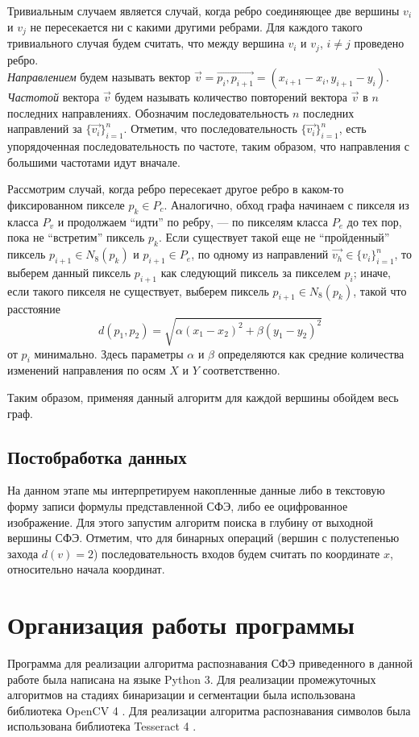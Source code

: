 \documentclass[makeidx, a4paper, 14pt]{extarticle}
\begin{document}
Тривиальным случаем является случай, когда ребро соединяющее две вершины $v_i$ и $v_j$ не пересекается ни с какими другими ребрами.
Для каждого такого тривиального случая будем считать, что между вершина $v_i$ и $v_j$, ${i \neq j}$ проведено ребро. \\

\emph{Направлением} будем называть вектор $\vec{v}=\overrightarrow{p_i,p_{i+1}}=(x_{i+1}-x_i, y_{i+1}-y_i)$.
\emph{Частотой} вектора $\vec{v}$ будем называть количество повторений вектора $\vec{v}$ в $n$ последних направлениях.
Обозначим последовательность $n$ последних направлений за $\{\vec{v_i}\}_{i=1}^{n}$.
Отметим, что последовательность $\{\vec{v_i}\}_{i=1}^{n}$, есть упорядоченная последовательность по частоте,
таким образом, что направления с большими частотами идут вначале.

Рассмотрим случай, когда ребро пересекает другое ребро в каком-то фиксированном пикселе $p_k \in P_c$.
Аналогично, обход графа начинаем с пикселя из класса $P_v$ и продолжаем ``идти'' по ребру, --- по пикселям класса $P_e$ до тех пор,
пока не ``встретим'' пиксель $p_k$. Если существует такой еще не ``пройденный'' пиксель $p_{i+1} \in N_8(p_k)$ и $p_{i+1} \in P_e$,
по одному из направлений $\vec{v_h} \in \{v_i\}_{i=1}^{n}$, то выберем данный пиксель $p_{i+1}$ как следующий пиксель за пикселем $p_i$;
иначе, если такого пикселя не существует, выберем пиксель $p_{i+1} \in N_8(p_k)$, такой что расстояние \[d(p_1, p_2) = \sqrt{\alpha(x_1-x_2)^2+\beta(y_1-y_2)^2}\]
от $p_i$ минимально. Здесь параметры $\alpha$ и $\beta$ определяются как средние количества изменений направления по осям $X$ и $Y$ соответственно.

Таким образом, применяя данный алгоритм для каждой вершины обойдем весь граф.

\subsection{Постобработка данных}
На данном этапе мы интерпретируем накопленные данные либо в текстовую форму записи формулы представленной СФЭ, либо
ее оцифрованное изображение. Для этого запустим алгоритм поиска в глубину \cite{dfs} от выходной вершины СФЭ.
Отметим, что для бинарных операций (вершин с полустепенью захода $d(v) = 2$) последовательность входов будем считать по координате $x$,
относительно начала координат.

\section{Организация работы программы}
Программа для реализации алгоритма распознавания СФЭ приведенного в данной работе была написана на языке Python 3.
Для реализации промежуточных алгоритмов на стадиях бинаризации и сегментации была использована библиотека OpenCV 4 \cite{opencv4}.
Для реализации алгоритма распознавания символов была использована библиотека Tesseract 4 \cite{tesseract}.
\end{document}
